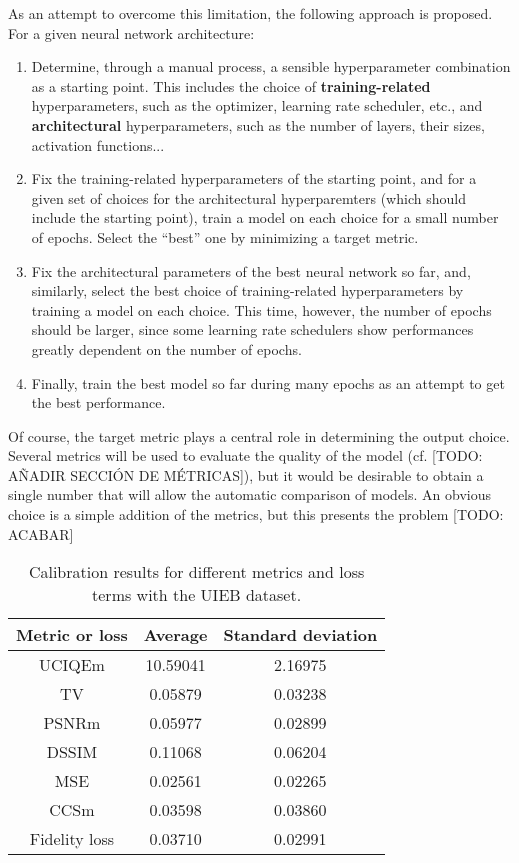 \documentclass[twocolumn,twoside,a4paper,10pt]{IEEEtran}
\begin{document}
As an attempt to overcome this limitation, the following approach is proposed. For a given neural network architecture:
\begin{enumerate}
  \item Determine, through a manual process, a sensible hyperparameter combination as a starting point. This includes the choice of \textbf{training-related} hyperparameters, such as the optimizer, learning rate scheduler, etc., and \textbf{architectural} hyperparameters, such as the number of layers, their sizes, activation functions...
  \item Fix the training-related hyperparameters of the starting point, and for a given set of choices for the architectural hyperparemters (which should include the starting point), train a model on each choice for a small number of epochs. Select the ``best'' one by minimizing a target metric.
  \item Fix the architectural parameters of the best neural network so far, and, similarly, select the best choice of training-related hyperparameters by training a model on each choice. This time, however, the number of epochs should be larger, since some learning rate schedulers show performances greatly dependent on the number of epochs.
  \item Finally, train the best model so far during many epochs as an attempt to get the best performance.
\end{enumerate}

Of course, the target metric plays a central role in determining the output choice. Several metrics will be used to evaluate the quality of the model (cf. [TODO: AÑADIR SECCIÓN DE MÉTRICAS]), but it would be desirable to obtain a single number that will allow the automatic comparison of models. An obvious choice is a simple addition of the metrics, but this presents the problem [TODO: ACABAR]

\begin{table}[h]
\centering
\caption{Calibration results for different metrics and loss terms with the UIEB dataset.}
\begin{tabular}{|c|c|c|}
\hline
\textbf{Metric or loss} & \textbf{Average} & \textbf{Standard deviation} \\ \hline
UCIQEm                  & 10.59041         & 2.16975                     \\ \hline
TV                      & 0.05879          & 0.03238                     \\ \hline
PSNRm                   & 0.05977          & 0.02899                     \\ \hline
DSSIM                   & 0.11068          & 0.06204                     \\ \hline
MSE                     & 0.02561          & 0.02265                     \\ \hline
CCSm                    & 0.03598          & 0.03860                     \\ \hline
Fidelity loss           & 0.03710          & 0.02991                     \\ \hline
\end{tabular}
\end{table}
\end{document}
